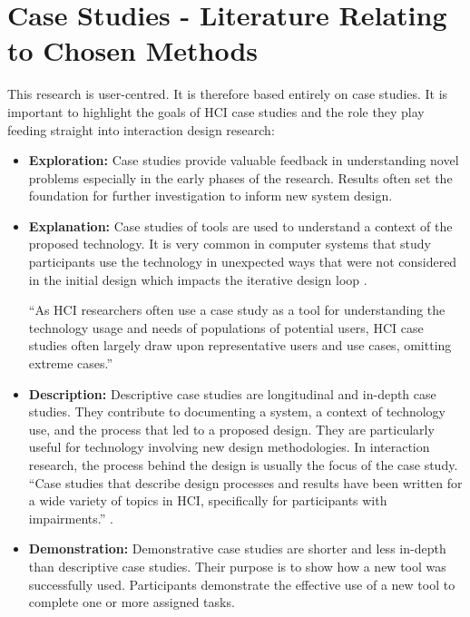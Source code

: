 \section{Case Studies - Literature Relating to Chosen Methods}

This research is user-centred. It is therefore based entirely on case studies. It is important to highlight the goals of HCI case studies \parencite{Lazar2010} \parencite{Cox2008} and the role they play feeding straight into interaction design research:

\begin{itemize}
    \item \textbf{Exploration:} Case studies provide valuable feedback in understanding novel problems especially in the early phases of the research.  Results often set the foundation for further investigation to inform new system design.
    
    \item \textbf{Explanation:} Case studies of tools are used to understand a context of the proposed technology.  It is very common in computer systems that study participants use the technology in unexpected ways that were not considered in the initial design which impacts the iterative design loop \parencite{Klasnja2011}.
    
    ``As HCI researchers often use a case study as a tool for understanding the technology usage and needs of populations of potential users, HCI case studies often largely draw upon representative users and use cases, omitting extreme cases.'' \parencite{Lazar2010}
    
    \item \textbf{Description:} Descriptive case studies are longitudinal and in-depth case studies.  They contribute to documenting a system, a context of technology use, and the process that led to a proposed design. They are particularly useful for technology involving new design methodologies. In interaction  research, the process behind the design is usually the focus of the case study.  ``Case studies that describe design processes and results have been written for a wide variety of topics in HCI, specifically for participants with impairments.'' \parencite{Lazar2010}  \parencite{Cox2008}.
    
    \item \textbf{Demonstration:} Demonstrative case studies are shorter and less in-depth than descriptive case studies.  Their purpose is to show how a new tool was successfully used.  Participants demonstrate the effective use of a new tool to complete one or more assigned tasks. 
\end{itemize}   

